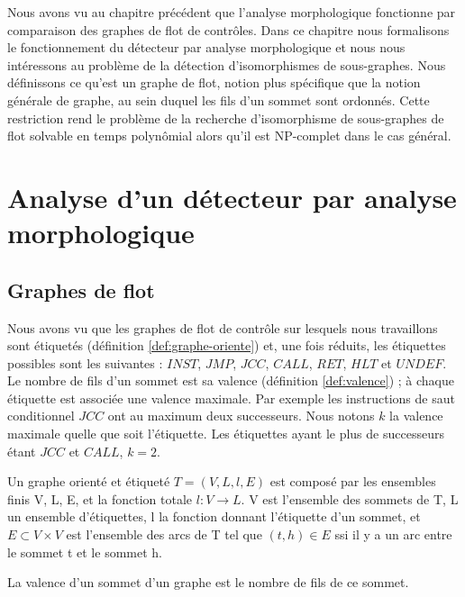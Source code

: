 Nous avons vu au chapitre précédent que l'analyse morphologique fonctionne par comparaison des graphes de flot de contrôles.
Dans ce chapitre nous formalisons le fonctionnement du détecteur par analyse morphologique et nous nous intéressons au problème de la détection d'isomorphismes de sous-graphes. 
Nous définissons ce qu'est un graphe de flot, notion plus spécifique que la notion générale de graphe, au sein duquel les fils d'un sommet sont ordonnés.
Cette restriction rend le problème de la recherche d'isomorphisme de sous-graphes de flot solvable en temps polynômial alors qu'il est NP-complet dans le cas général.

\section{Analyse d'un détecteur par analyse morphologique}
\subsection{Graphes de flot}
Nous avons vu que les graphes de flot de contrôle sur lesquels nous travaillons sont étiquetés (définition \ref{def:graphe-oriente}) et, une fois réduits, les étiquettes possibles sont les suivantes : $INST$, $JMP$, $JCC$, $CALL$, $RET$, $HLT$ et $UNDEF$.
Le nombre de fils d'un sommet est sa valence (définition \ref{def:valence}) ; à chaque étiquette est associée une valence maximale. Par exemple les instructions de saut conditionnel $JCC$ ont au maximum deux successeurs.
Nous notons $k$ la valence maximale quelle que soit l'étiquette. Les étiquettes ayant le plus de successeurs étant $JCC$ et $CALL$, $k=2$.

\begin{defi}
Un graphe orienté et étiqueté $T=(V, L, l, E)$ est composé par les ensembles finis V, L, E, et la fonction totale $l:V\rightarrow L$.
V est l'ensemble des sommets de T, L un ensemble d'étiquettes, l la fonction donnant l'étiquette d'un sommet, et $E\subset V\times V$ est l'ensemble des arcs de T tel que $(t, h)\in E$ ssi il y a un arc entre le sommet t et le sommet h.
\label{def:graphe-oriente}
\end{defi}

\begin{defi}\label{def:valence}
 La valence d'un sommet d'un graphe est le nombre de fils de ce sommet.
\end{defi}


